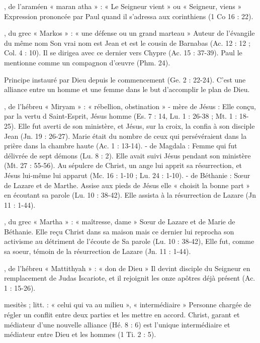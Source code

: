 \begin{multicols}{2}
, de l'araméen « maran atha » : « Le Seigneur vient » ou « Seigneur, viens »
Expression prononcée par Paul quand il s'adressa aux corinthiens (1 Co 16 : 22).


, du grec « Markos » : « une défense ou un grand marteau »
Auteur de l'évangile du même nom Son vrai nom est Jean et est le cousin de Barnabas (Ac. 12 : 12 ; Col. 4 : 10). Il se dirigea avec ce dernier vers Chypre (Ac. 15 : 37-39). Paul le mentionne comme un compagnon d'œuvre (Phm. 24).


Principe instauré par Dieu depuis le commencement (Ge. 2 : 22-24). C'est une alliance entre un homme et une femme dans le but d'accomplir le plan de Dieu.


, de l'hébreu « Miryam » : « rébellion, obstination »
- mère de Jésus : Elle conçu, par la vertu d Saint-Esprit, Jésus homme (Es. 7 : 14, Lu. 1 : 26-38 ; Mt. 1 : 18-25). Elle fut averti de son ministère, et Jésus, sur la croix, la confia à son disciple Jean (Jn. 19 : 26-27). Marie était du nombre de ceux qui persévéraient dans la prière dans la chambre haute (Ac. 1 : 13-14).
- de Magdala : Femme qui fut délivrée de sept démons (Lu. 8 : 2). Elle avait suivi Jésus pendant son ministère (Mt. 27 : 55-56). Au sépulcre de Christ, un ange lui apprit sa résurrection, et Jésus lui-même lui apparut (Mc. 16 : 1-10 ; Lu. 24 : 1-10).
- de Béthanie : Sœur de Lazare et de Marthe. Assise aux pieds de Jésus elle « choisit la bonne part » en écoutant sa parole (Lu. 10 : 38-42). Elle assista à la résurrection de Lazare (Jn 11 : 1-44).


, du grec « Martha » : « maîtresse, dame »
Sœur de Lazare et de Marie de Béthanie. Elle reçu Christ dans sa maison mais ce dernier lui reprocha son activisme au détriment de l'écoute de Sa parole (Lu. 10 : 38-42), Elle fut, comme sa soeur, témoin de la résurrection de Lazare (Jn. 11 : 1-44).


, de l'hébreu « Mattithyah » : « don de Dieu »
Il devint disciple du Seigneur en remplacement de Judas Iscariote, et il rejoignit les onze apôtres déjà présent (Ac. 1 : 15-26).


mesitès ; litt. : « celui qui va au milieu », « intermédiaire »
Personne chargée de régler un conflit entre deux parties et les mettre en accord.
Christ, garant et médiateur d'une nouvelle alliance (Hé. 8 : 6) est l'unique intermédiaire et médiateur entre Dieu et les hommes (1 Ti. 2 : 5).



\end{multicols}
